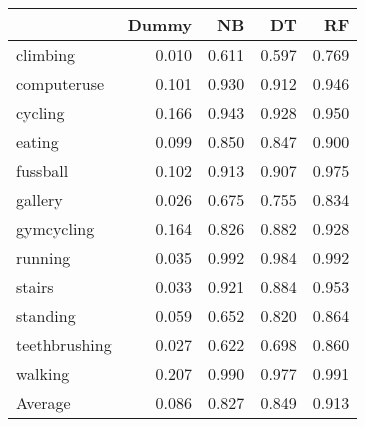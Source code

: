 \begin{tabular}{lrrrr}
\toprule
{} &  Dummy &    NB &    DT &    RF \\
\midrule
climbing      &  0.010 & 0.611 & 0.597 & 0.769 \\
computeruse   &  0.101 & 0.930 & 0.912 & 0.946 \\
cycling       &  0.166 & 0.943 & 0.928 & 0.950 \\
eating        &  0.099 & 0.850 & 0.847 & 0.900 \\
fussball      &  0.102 & 0.913 & 0.907 & 0.975 \\
gallery       &  0.026 & 0.675 & 0.755 & 0.834 \\
gymcycling    &  0.164 & 0.826 & 0.882 & 0.928 \\
running       &  0.035 & 0.992 & 0.984 & 0.992 \\
stairs        &  0.033 & 0.921 & 0.884 & 0.953 \\
standing      &  0.059 & 0.652 & 0.820 & 0.864 \\
teethbrushing &  0.027 & 0.622 & 0.698 & 0.860 \\
walking       &  0.207 & 0.990 & 0.977 & 0.991 \\
Average       &  0.086 & 0.827 & 0.849 & 0.913 \\
\bottomrule
\end{tabular}
